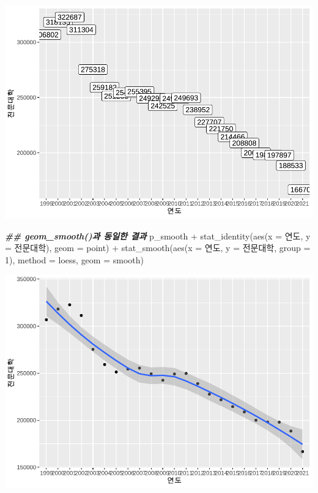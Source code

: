 \documentclass[
]{article}
\newenvironment{Shaded}{\begin{snugshade}}{\end{snugshade}}
\newcommand{\AttributeTok}[1]{\textcolor[rgb]{0.77,0.63,0.00}{#1}}
\newcommand{\DecValTok}[1]{\textcolor[rgb]{0.00,0.00,0.81}{#1}}
\newcommand{\DocumentationTok}[1]{\textcolor[rgb]{0.56,0.35,0.01}{\textbf{\textit{#1}}}}
\newcommand{\FunctionTok}[1]{\textcolor[rgb]{0.00,0.00,0.00}{#1}}
\newcommand{\NormalTok}[1]{#1}
\newcommand{\SpecialCharTok}[1]{\textcolor[rgb]{0.00,0.00,0.00}{#1}}
\newcommand{\StringTok}[1]{\textcolor[rgb]{0.31,0.60,0.02}{#1}}
\begin{document}
\includegraphics{chap3_files/figure-latex/unnamed-chunk-51-6.pdf}

\begin{Shaded}
\begin{Highlighting}[]
\DocumentationTok{\#\# geom\_smooth()과 동일한 결과}
\NormalTok{p\_smooth }\SpecialCharTok{+} 
  \FunctionTok{stat\_identity}\NormalTok{(}\FunctionTok{aes}\NormalTok{(}\AttributeTok{x =}\NormalTok{ 연도, }\AttributeTok{y =}\NormalTok{ 전문대학), }\AttributeTok{geom =} \StringTok{\textquotesingle{}point\textquotesingle{}}\NormalTok{) }\SpecialCharTok{+}
  \FunctionTok{stat\_smooth}\NormalTok{(}\FunctionTok{aes}\NormalTok{(}\AttributeTok{x =}\NormalTok{ 연도, }\AttributeTok{y =}\NormalTok{ 전문대학, }\AttributeTok{group =} \DecValTok{1}\NormalTok{), }\AttributeTok{method =} \StringTok{\textquotesingle{}loess\textquotesingle{}}\NormalTok{, }\AttributeTok{geom =} \StringTok{\textquotesingle{}smooth\textquotesingle{}}\NormalTok{)}
\end{Highlighting}
\end{Shaded}

\includegraphics{chap3_files/figure-latex/unnamed-chunk-51-7.pdf}
\end{document}

